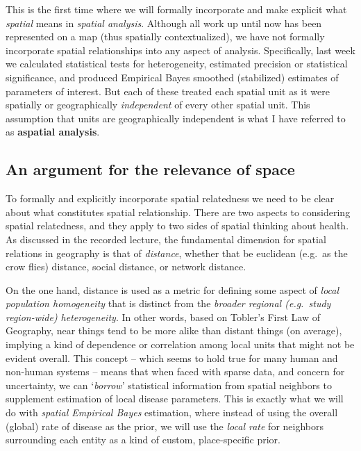 \documentclass[
]{book}
\begin{document}
This is the first time where we will formally incorporate and make explicit what \emph{spatial} means in \emph{spatial analysis}. Although all work up until now has been represented on a map (thus spatially contextualized), we have not formally incorporate spatial relationships into any aspect of analysis. Specifically, last week we calculated statistical tests for heterogeneity, estimated precision or statistical significance, and produced Empirical Bayes smoothed (stabilized) estimates of parameters of interest. But each of these treated each spatial unit as it were spatially or geographically \emph{independent} of every other spatial unit. This assumption that units are geographically independent is what I have referred to as \textbf{aspatial analysis}.

\hypertarget{an-argument-for-the-relevance-of-space}{%
\subsection{An argument for the relevance of space}\label{an-argument-for-the-relevance-of-space}}

To formally and explicitly incorporate spatial relatedness we need to be clear about what constitutes spatial relationship. There are two aspects to considering spatial relatedness, and they apply to two sides of spatial thinking about health. As discussed in the recorded lecture, the fundamental dimension for spatial relations in geography is that of \emph{distance}, whether that be euclidean (e.g.~as the crow flies) distance, social distance, or network distance.

On the one hand, distance is used as a metric for defining some aspect of \emph{local population homogeneity} that is distinct from the \emph{broader regional (e.g.~study region-wide) heterogeneity}. In other words, based on Tobler's First Law of Geography, near things tend to be more alike than distant things (on average), implying a kind of dependence or correlation among local units that might not be evident overall. This concept -- which seems to hold true for many human and non-human systems -- means that when faced with sparse data, and concern for uncertainty, we can `\emph{borrow}' statistical information from spatial neighbors to supplement estimation of local disease parameters. This is exactly what we will do with \emph{spatial Empirical Bayes} estimation, where instead of using the overall (global) rate of disease as the prior, we will use the \emph{local rate} for neighbors surrounding each entity as a kind of custom, place-specific prior.
\end{document}
